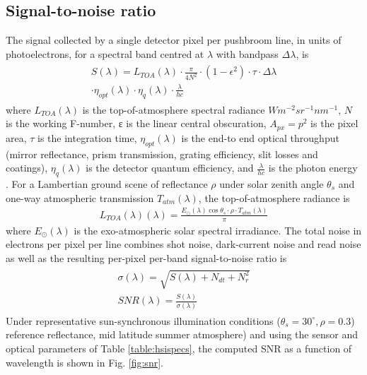 \documentclass{iac}
\begin{document}
\subsection{Signal-to-noise ratio}
The signal collected by a single detector pixel per pushbroom line, in units of photoelectrons, for a spectral band centred at \(\lambda\) with bandpass \(\Delta \lambda\), is 
\begin{eqnarray}
	\begin{aligned}
	S(\lambda) = L_{TOA}(\lambda) \cdot \frac{\pi}{4N^2}\cdot (1-\epsilon^2)\cdot \tau\cdot \Delta\lambda \\
	\cdot \eta_{opt}(\lambda) \cdot\eta_q(\lambda)\cdot\frac{\lambda}{hc}
	\end{aligned}
\end{eqnarray}
where \( L_{TOA}(\lambda)\) is the top-of-atmosphere spectral radiance \(Wm^{-2}sr^{-1}nm^{-1}\), \(N\) is the working F-number, ε is the linear central obscuration, \(A_{px}=p^2\) is the pixel area, \(\tau\) is the integration time, \(\eta_{opt}(\lambda)\) is the end-to end optical throughput (mirror reflectance, prism transmission, grating efficiency, slit losses and coatings), \(\eta_q(\lambda)\) is the detector quantum efficiency, and \(\frac{\lambda}{hc}\) is the photon energy \cite{mouroulis2018review,ieee2012icsai}. For a Lambertian ground scene of reflectance \(\rho\) under solar zenith angle \(\theta_s\) and one-way atmospheric transmission \(T_{atm} (\lambda)\), the top-of-atmosphere radiance is
\begin{eqnarray}
	 L_{TOA}(\lambda) (\lambda) = \frac{E_{\odot}(\lambda)\cos\theta_s\cdot\rho\cdot T_{atm}(\lambda)}{\pi}
\end{eqnarray}
where \(E_{\odot}(\lambda)\) is the exo-atmospheric solar spectral irradiance. The total noise in electrons per pixel per line combines shot noise, dark-current noise and read noise as well as the resulting per-pixel per-band signal-to-noise ratio is 
\begin{eqnarray}
	\begin{aligned}
	\sigma(\lambda) = \sqrt{S(\lambda) + N_{dt} +N_r^2}\\
	SNR(\lambda) = \frac{S(\lambda)}{\sigma(\lambda)}
	\end{aligned}
\end{eqnarray}
Under representative sun-synchronous illumination conditions (\(\theta_s = 30^{\circ}, \rho=0.3\)) reference reflectance, mid latitude summer atmosphere) and using the sensor and optical parameters of Table \ref{table:hsispecs}, the computed SNR as a function of wavelength is shown in Fig. \ref{fig:snr}. 
\end{document}
